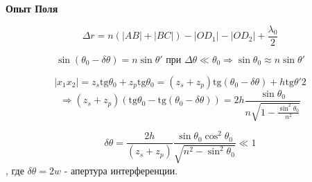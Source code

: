 \documentclass[12pt, a4paper]{report}
\begin{document}
\textbf{Опыт Поля} 


\[ \Delta r = n \left( |AB| + |BC| \right) - |O D_1     |- |O D_2   | + \frac{\lambda_0}{2 }  \] 

\[ \sin (\theta_0 - \delta \theta  )  = n \sin \theta' \text{ при }  \Delta \theta \ll \theta_0 \Rightarrow \sin \theta_0 \approx n \sin \theta'  \] 

\[ |x_1 x_2 | = z_s \mathrm{tg }  \theta_0 + z_p \mathrm{tg }   \theta_0 = (z_s + z_p ) \mathrm{tg }  (\theta_0 - \delta \theta ) + h \mathrm{tg }  \theta ' 2     \] 
\[ \Rightarrow (z_s + z_p )(\mathrm{tg }  \theta_0 - \mathrm{tg }  (\theta_0 - \delta \theta )  ) = 2h \frac{\sin \theta_0 }{n \sqrt{\displaystyle  1 - \frac{\sin  ^2 \theta_0 }{n ^2 } }} \] 

\[ \delta \theta = \frac{2h}{(z_s +z_p )} \frac{\sin  \theta_0 \cos  ^2 \theta_0 }{\sqrt{n ^2 - \sin  ^2 \theta_0 }} \ll 1    \] 
, где \( \delta \theta  = 2w \)  - апертура интерференции.




\ifdefined\mainfile
\else
    
\end{document}

